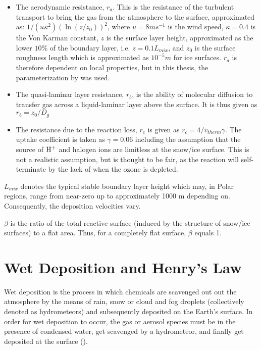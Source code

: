 \begin{itemize}
    \item The aerodynamic resistance, $r_a$. This is the resistance of the turbulent transport to bring the gas from the atmosphere to the surface, approximated as: $1/(u\kappa^2)(\ln(z/z_0))^2$, where $u = 8 ms^{-1}$ is the wind speed, $\kappa = 0.4$ is the Von Karman constant, $z$ is the surface layer height, approximated as the lower $10\%$ of the boundary layer, i.e. $z = 0.1L_{mix}$, and $z_0$ is the surface roughness length which is approximated as $10^{-5} m$ for ice surfaces. $r_a$ is therefore dependent on local properties, but in this thesis, the parameterization by \cite{CAO} was used. 
    \item The quasi-laminar layer resistance, $r_b$, is the ability of molecular diffusion to transfer gas across a liquid-laminar layer above the surface. It is thus given as $r_b = z_0/D_g$
    \item The resistance due to the reaction loss, $r_c$ is given as $r_c = 4/v_{therm}\gamma$. The uptake coefficient is taken as $\gamma = 0.06$ including the assumption that the source of $\mathrm{H^+}$ and halogen ions are limitless at the snow/ice surface. This is not a realistic assumption, but is thought to be fair, as the reaction will self-terminate by the lack of  when the ozone is depleted. 
\end{itemize}

$L_{mix}$ denotes the typical stable boundary layer height which may, in Polar regions, range from near-zero up to approximately 1000 m depending on. Consequently, the deposition velocities vary.

\medskip

$\beta$ is the ratio of the total reactive surface (induced by the structure of snow/ice surfaces) to a flat area. Thus, for a completely flat surface, $\beta$ equals 1. 





\section{Wet Deposition and Henry's Law}\label{sec:wet_dep_henrys_law}

Wet deposition is the process in which chemicals are scavenged out out the atmosphere by the means of rain, snow or cloud and fog droplets (collectively denoted as hydrometeors) and subsequently deposited on the Earth's surface. In order for wet deposition to occur, the gas or aerosol species must be in the presence of condensed water, get scavenged by a hydrometeor, and finally get deposited at the surface (\cite{SeinfeldSpyros}). 

